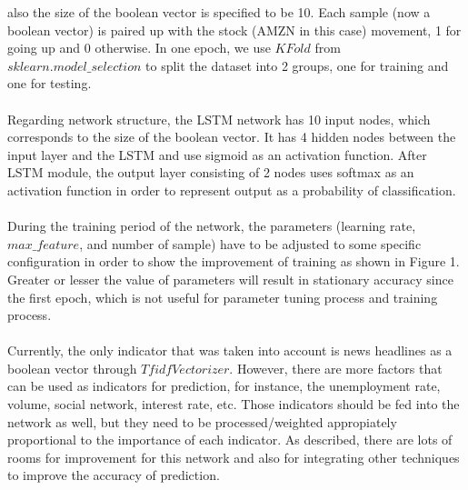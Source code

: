 \documentclass{article}
\begin{document}
 also the size of the boolean vector is specified to be 10. Each sample (now a boolean vector) is paired up with
 the stock (AMZN in this case) movement, 1 for going up and 0 otherwise. In one epoch, we use $KFold$ from
 $sklearn.model\_selection$ to split the dataset into 2 groups, one for training and one for testing.
\\\\
 Regarding network structure, the LSTM network has 10 input nodes, which corresponds to the size of
 the boolean vector. It has 4 hidden nodes between the input layer and the LSTM and use sigmoid as an activation
 function. After LSTM module, the output layer consisting of 2 nodes uses softmax as an activation function in order
 to represent output as a probability of classification.
\\\\
During the training period of the network, the parameters (learning rate, $max\_feature$, and number of sample) have
 to be adjusted to some specific configuration in order to show the improvement of training as shown in Figure 1.
 Greater or lesser the value of parameters will result in stationary accuracy since the first epoch, which is not
 useful for parameter tuning process and training process.
\\\\
Currently, the only indicator that was taken into account is news headlines as a boolean vector through $TfidfVectorizer$.
 However, there are more factors that can be used as indicators for prediction, for instance, the unemployment rate,
 volume, social network, interest rate, etc. Those indicators should be fed into the network as well, but they need
 to be processed/weighted appropiately proportional to the importance of each indicator. As described, there are lots
 of rooms for improvement for this network and also for integrating other techniques to improve the accuracy of prediction.
\end{document}
